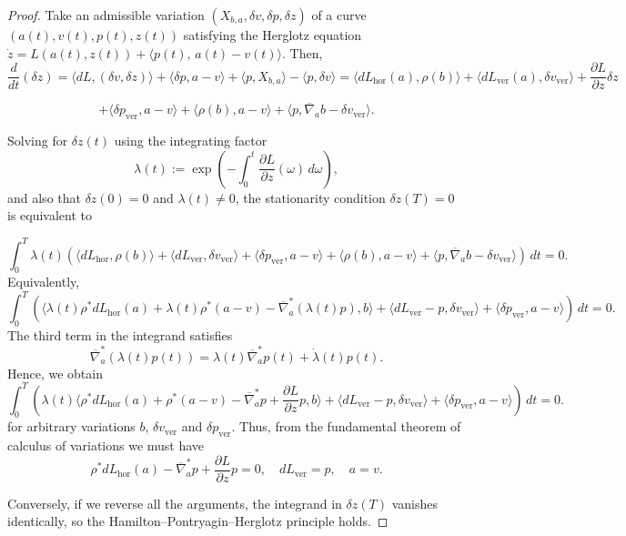 \documentclass[11pt,a4paper]{article}
\theoremstyle{definition}
\begin{document}
\begin{proof}
Take an admissible variation $(X_{b,a}, \delta v, \delta p, \delta z)$ of a curve $(a(t), v(t), p(t), z(t))$ satisfying the Herglotz equation $\dot{z}=L(a(t),z(t))+
\langle p(t),\,a(t)-v(t)\rangle$. Then,
$$\frac{d}{dt}(\delta z)= \langle d L, (\delta v, \delta z) \rangle + \langle \delta p, a -v \rangle + \langle p, X_{b,a}\rangle - \langle p,\delta v\rangle= \langle dL_{\mathrm{hor}}(a), \rho(b) \rangle + \langle dL_{\mathrm{ver}}(a), \delta v_{\mathrm{ver}} \rangle + \frac{\partial L}{\partial z}\delta z$$

$$+\langle \delta p_{\mathrm{ver}}, a-v \rangle + \langle \rho(b), a-v\rangle + \langle p, \overline{\nabla}_{a} b - \delta v_{\mathrm{ver}} \rangle.$$


Solving for $\delta z(t)$ using the integrating factor
\[
\lambda(t) := \exp\!\left(-\int_0^t \frac{\partial L}{\partial z}(\omega)\,d\omega\right),
\]
and also that $\delta z(0)=0$ and $\lambda(t)\neq 0$, the stationarity condition $\delta z(T)=0$ is equivalent to

\begin{equation*}
\int_0^T \lambda(t)
\left(
\langle dL_{\mathrm{hor}}, \rho(b) \rangle + \langle dL_{\mathrm{ver}},  \delta v_{\mathrm{ver}}\rangle +\langle \delta p_{\mathrm{ver}}, a-v \rangle + \langle \rho(b), a-v\rangle + \langle p, \overline{\nabla}_{a} b - \delta v_{\mathrm{ver}} \rangle
\right) \,dt = 0.
\end{equation*}
Equivalently,
\[
\int_0^T \left(
\langle \lambda(t)\rho^{*}dL_{\mathrm{hor}}(a) + \lambda(t)\rho^{*}(a-v) -  \overline{\nabla}_{a}^{*}\left(\lambda(t)p\right), b \rangle + \langle dL_{\mathrm{ver}} - p,  \delta v_{\mathrm{ver}}\rangle + \langle \delta p_{\mathrm{ver}}, a-v \rangle
\right) \,dt = 0.
\]
The third term in the integrand satisfies
$$\overline{\nabla}_{a}^{*}\left(\lambda(t)p(t)\right) = \lambda(t)\overline{\nabla}_{a}^{*} p(t)  +\dot{\lambda}(t) p(t).$$
Hence, we obtain
\[
\int_0^T \left(
\lambda(t)\langle \rho^{*}dL_{\mathrm{hor}}(a) + \rho^{*}(a-v) - \overline{\nabla}_{a}^{*} p  + \frac{\partial L}{\partial z} p, b \rangle + \langle dL_{\mathrm{ver}} - p,  \delta v_{\mathrm{ver}}\rangle + \langle \delta p_{\mathrm{ver}}, a-v \rangle
\right) \,dt = 0.
\]
for arbitrary variations $b$, $\delta v_{\mathrm{ver}}$ and $\delta p_{\mathrm{ver}}$. Thus, from the fundamental theorem of calculus of variations we must have
$$\rho^{*}dL_{\mathrm{hor}}(a) - \overline{\nabla}_{a}^{*}p + \frac{\partial L}{\partial z} p = 0, \quad dL_{\mathrm{ver}} = p, \quad a=v.$$

Conversely, if we reverse all the arguments, the integrand in $\delta z(T)$ vanishes
identically, so the Hamilton--Pontryagin--Herglotz principle holds.
\end{proof}
\end{document}
